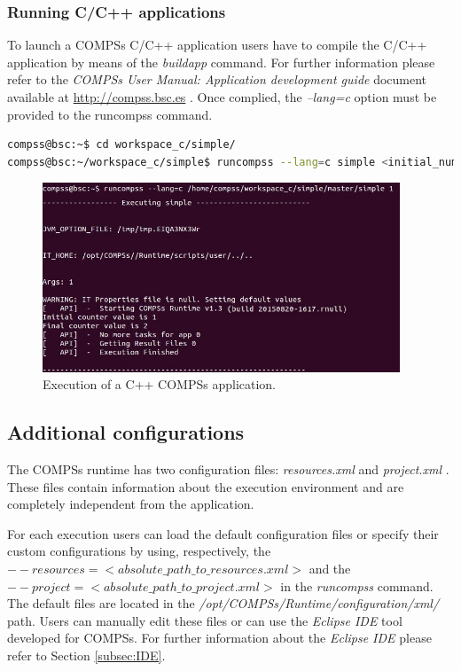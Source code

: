 \subsubsection{Running C/C++ applications}
To launch a COMPSs C/C++ application users have to compile the C/C++ application by means of the \textit{buildapp} command. For 
further information please refer to the \textit{COMPSs User Manual: Application development guide} document available at \url{http://compss.bsc.es} . Once complied, 
the \textit{--lang=c} option must be provided to the runcompss command.

\begin{lstlisting}[language=bash]
compss@bsc:~$ cd workspace_c/simple/
compss@bsc:~/workspace_c/simple$ runcompss --lang=c simple <initial_number>
\end{lstlisting}

\begin{figure}[h!]
  \centering
    \includegraphics[width=0.95\textwidth]{./Sections/2_Execution/Figures/c_execution.jpeg}
    \caption{Execution of a C++ COMPSs application.}
    \label{fig:c_execution}
\end{figure}
\vspace{-0.4cm}


\subsection{Additional configurations}

The COMPSs runtime has two configuration files: \textit{resources.xml} and \textit{project.xml} . 
These files contain information about the execution environment and are completely independent from the application.

For each execution users can load the default configuration files or specify their custom configurations 
by using, respectively, the \textit{$--resources=<absolute\_path\_to\_resources.xml>$} and the
\textit{$--project=<absolute\_path\_to\_project.xml>$} in the \textit{runcompss} command. The default files are located 
in the \emph{/opt/COMPSs/Runtime/configuration/xml/} path. 
Users can manually edit these files or can use the \textit{Eclipse IDE} tool developed for COMPSs. For further 
information about the \textit{Eclipse IDE} please refer to Section \ref{subsec:IDE}. 


